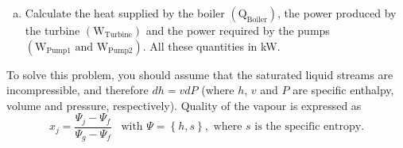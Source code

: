 \documentclass[calculator,steamtables,refrigeranttables,psychrometricchart,datasheet,resit]{exam}
\newcommand{\frc}{\displaystyle\frac}
\begin{document}
\begin{question}
\begin{enumerate}[(a)]
\item Calculate the heat supplied by the boiler $\left(\text{Q}_{\text{Boiler}}\right)$, the power produced by the turbine $\left(\text{W}_{\text{Turbine}}\right)$ and the power required by the pumps $\left(\text{W}_{\text{Pump1}}\text{ and W}_{\text{Pump2}}\right)$. All these quantities in kW.~
\end{enumerate}

To solve this problem, you should assume that the saturated liquid streams are incompressible, and therefore $dh = vdP$ (where $h$, $v$ and $P$ are specific enthalpy, volume and pressure, respectively). Quality of the vapour is expressed as
\begin{displaymath}
x_{j} = \frc{\Psi_{j}-\Psi_{f}}{\Psi_{g}-\Psi_{f}}\;\;\;\text{with }\Psi=\left\{h,s\right\},\text{ where } s \text{ is the specific entropy.}
\end{displaymath}


\end{question}

\clearpage
\end{document}
